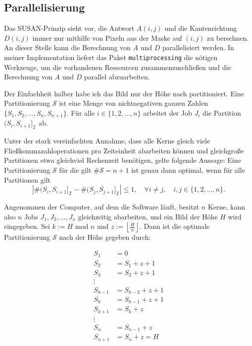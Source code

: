 \documentclass[a4paper, 11pt]{report}
\theoremstyle{definition}
\begin{document}
			\subsection{Parallelisierung}
				Das SUSAN-Prinzip sieht vor, die Antwort $A(i,j)$ und die Kantenrichtung $D(i,j)$ immer nur mithilfe von Pixeln aus der Maske auf $(i,j)$ zu berechnen. An dieser Stelle kann die Berechnung von $A$ und $D$ parallelisiert werden. In meiner Implementation liefert das Paket \texttt{multiprocessing} die nötigen Werkzeuge, um die vorhandenen Ressourcen zusammenzuschließen und die Berechnung von $A$ und $D$ parallel abzuarbeiten.

				Der Einfachheit halber habe ich das Bild nur der Höhe nach partitioniert. Eine Partitionierung $\mathcal{S}$ ist eine Menge von nichtnegativen ganzen Zahlen $\{S_1, S_2, ..., S_n, S_{n+1}\}$. Für alle $i \in \{1,2,...,n\}$ arbeitet der Job $J_i$ die Partition $(S_i, S_{i+1}]_\mathbb{Z}$ ab.

				Unter der stark vereinfachten Annahme, dass alle Kerne gleich viele Fließkommazahloperationen pro Zeiteinheit abarbeiten können und gleichgroße Partitionen etwa gleichviel Rechenzeit benötigen, gelte folgende Aussage: Eine Partitionierung $\mathcal{S}$ für die gilt $\#\mathcal{S} = n+1$ ist genau dann optimal, wenn für alle Partitionen gilt
				$$|\#(S_i, S_{i+1}]_\mathbb{Z} - \#(S_j, S_{j+1}]_\mathbb{Z}| \leq 1, \quad \forall i \neq j, \quad i,j \in \{1,2,...,n\}.$$

				Angenommen der Computer, auf dem die Software läuft, besitzt $n$ Kerne, kann also $n$ Jobs $J_1,J_2,...,J_n$ gleichzeitig abarbeiten, und ein Bild der Höhe $H$ wird eingegeben. Sei $k := H \text{ mod } n$ und $z := \left\lfloor \frac{H}{n} \right\rfloor$. Dann ist die optimale Partitionierung $\mathcal{S}$ nach der Höhe gegeben durch:

				\begin{align*}
				S_1 	&= 					0		\\
				S_2 	&= S_1		+	z + 1		\\
				S_3 	&= S_2 		+ 	z + 1		\\
									\vdots			\\
				S_{k-1} &= S_{k-2}	+ 	z + 1		\\
				S_{k}	&= S_{k-1} 	+ 	z + 1		\\
				S_{k+1} &= S_k 		+ 	z			\\
									\vdots			\\
				S_{n} 	&= S_{n-1} 	+ 	z 			\\
				S_{n+1} &= S_{n}	+	z  = H	\\
				\end{align*}
\end{document}
